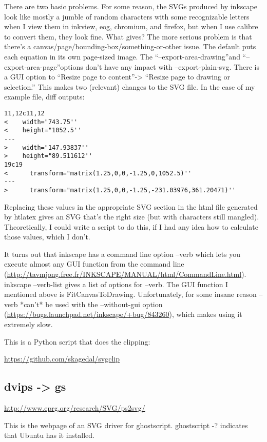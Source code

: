 \documentclass[12pt]{article}
\begin{document}
There are two basic problems.  For some reason, the SVGs produced by
inkscape look like mostly a jumble of random characters with some
recognizable letters when I view them in inkview, eog, chromium, and
firefox, but when I use calibre to convert them, they look fine.  What
gives?  The more serious problem is that there's a
canvas/page/bounding-box/something-or-other issue.  The default puts
each equation in its own page-sized image.  The
``--export-area-drawing''and ``--export-area-page''options don't have
any impact with --export-plain-svg.  There is a GUI option to ``Resize
page to content''-> ``Resize page to drawing or selection.'' This makes
two (relevant) changes to the SVG file.  In the case of my example
file, diff outputs:

\begin{lstlisting}
11,12c11,12
<    width="743.75''
<    height="1052.5''
---
>    width="147.93837''
>    height="89.511612''
19c19
<      transform="matrix(1.25,0,0,-1.25,0,1052.5)''
---
>      transform="matrix(1.25,0,0,-1.25,-231.03976,361.20471)'' 
\end{lstlisting}

Replacing these values in the appropriate SVG section in the html file
generated by htlatex gives an SVG that's the right size (but with
characters still mangled).  Theoretically, I could write a script to
do this, if I had any idea how to calculate those values, which I
don't.

It turns out that inkscape has a command line option --verb which lets
you execute almost any GUI function from the command line
(\url{http://tavmjong.free.fr/INKSCAPE/MANUAL/html/CommandLine.html}).
inkscape --verb-list gives a list of options for --verb.  The GUI
function I mentioned above is FitCanvasToDrawing.  Unfortunately, for
some insane reason --verb *can't* be used with the --without-gui
option (\url{https://bugs.launchpad.net/inkscape/+bug/843260}), which
makes using it extremely slow.

This is a Python script that does the clipping:

\url{https://github.com/skagedal/svgclip}

\subsection{dvips -> gs}
\label{sec:dvips_gs}

\url{http://www.eprg.org/research/SVG/ps2svg/}

This is the webpage of an SVG driver for ghostscript.  ghostscript -?
indicates that Ubuntu has it installed.
\end{document}
